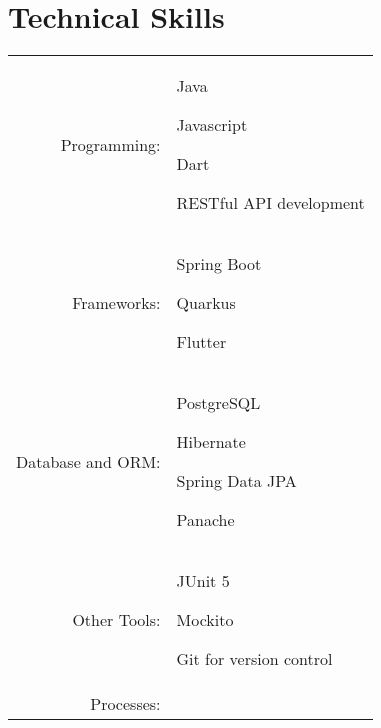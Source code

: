 \documentclass[a4paper,12pt]{article}
\begin{document}

\section{Technical Skills}
\begin{tabular}{rp{15.2cm}}
\raggedleft Programming:
& \begin{itemize*}[label=\Large\textbullet] %
    \item Java
    \item Javascript
    \item Dart
    \item RESTful API development
\end{itemize*}\\
\raggedleft Frameworks:
& \begin{itemize*}[label=\Large\textbullet]
    \item Spring Boot
    \item Quarkus
    \item Flutter
\end{itemize*}\\
\raggedleft Database and ORM:
& \begin{itemize*}[label=\Large\textbullet]
    \item PostgreSQL
    \item Hibernate
    \item Spring Data JPA
    \item Panache
\end{itemize*}\\
\raggedleft Other Tools:
& \begin{itemize*}[label=\Large\textbullet]
    \item JUnit 5
    \item Mockito
    \item Git for version control
\end{itemize*}\\
\raggedleft Processes:

\end{tabular}
\end{document}
